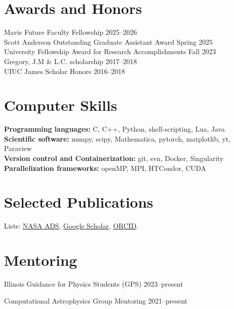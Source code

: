 \documentclass[11pt]{article}
\begin{document}
\section*{Awards and Honors}
Mavis Future Faculty Fellowship \hfill 2025--2026\\
Scott Anderson Outstanding Graduate Assistant Award \hfill Spring 2025\\
University Fellowship Award for Research Accomplishments \hfill Fall 2023\\
Gregory, J.M \& L.C. scholarship \hfill 2017--2018\\
UIUC James Scholar Honors \hfill 2016--2018

\ifdefined\withskills{}
\section*{Computer Skills}
\textbf{Programming languages:} C, C++, Python, shell-scripting, Lua, Java\\
\textbf{Scientific software:} numpy, scipy, Mathematica, pytorch, matplotlib, yt, Paraview\\
\textbf{Version control and Containerization: } git, svn, Docker, Singularity\\
\textbf{Parallelization frameworks: }openMP, MPI, HTCondor, CUDA

\else\fi


\section*{Selected Publications}
Lists: \href{\adslibrary}{NASA ADS}, \href{\googlescholar}{Google Scholar}, \href{https://orcid.org/0000-0002-2514-5965}{ORCID}.


\begin{etaremune}[leftmargin=1.25em]

\end{etaremune}


\section*{Mentoring}
Illinois Guidance for Physics Students (GPS) \hfill 2023--present\\

Computational Astrophysics Group Mentoring \hfill 2021--present\\
\end{document}

